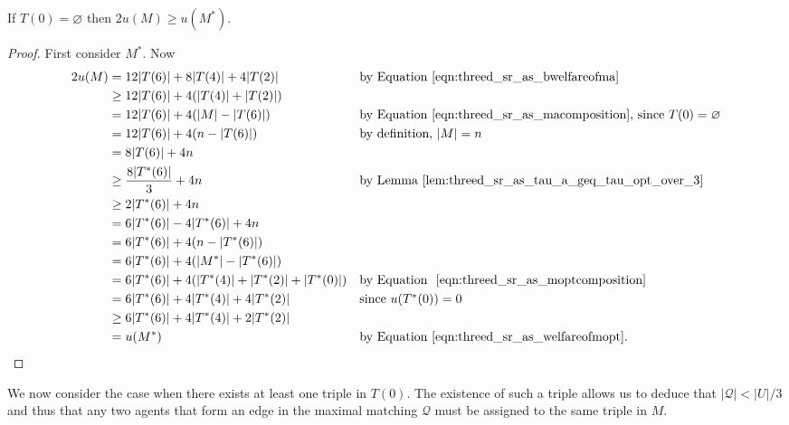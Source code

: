 \begin{lem}
\label{lem:threed_sr_as_no000exists_lem}
If $T(0) = \varnothing$ then $2{u(M)} \geq u(M^*)$.
\end{lem}
\begin{proof}
First consider $M^*$. 
Now
\begingroup
\allowdisplaybreaks
\begin{align*}
    2u(M) &= 12|T(6)| + 8|T(4)| + 4|T(2)| && \mbox{by Equation~\ref{eqn:threed_sr_as_bwelfareofma}}\\
    &\geq 12|T(6)| + 4(|T(4)| + |T(2)|)\\
    &= 12|T(6)| + 4(|M| - |T(6)|) && \mbox{by Equation~\ref{eqn:threed_sr_as_macomposition}, since $T(0)=\varnothing$}\\
    &= 12|T(6)| + 4(n - |T(6)|) && \mbox{by definition, $|M|=n$}\\
    &= 8|T(6)| + 4n\\[0.7em]
    &\geq \smash{\frac{8|T^*(6)|}{3}} + 4n && \mbox{by Lemma~\ref{lem:threed_sr_as_tau_a_geq_tau_opt_over_3}}\\[0.4em]
    &\geq 2|T^*(6)| + 4n\\
    &= 6|T^*(6)| - 4|T^*(6)| + 4n\\
    &= 6|T^*(6)| + 4(n - |T^*(6)|)\\
    &= 6|T^*(6)| + 4(|M^*| - |T^*(6)|)\\
    &= 6|T^*(6)| + 4(|T^*(4)| + |T^*(2)| + |T^*(0)|) && \mbox{by Equation~
    \ref{eqn:threed_sr_as_moptcomposition}}\\
    &= 6|T^*(6)| + 4|T^*(4)| + 4|T^*(2)| && \mbox{since $u(T^*(0))=0$}\\
    &\geq 6|T^*(6)| + 4|T^*(4)| + 2|T^*(2)|\\
    &= u(M^*) && \mbox{by Equation~\ref{eqn:threed_sr_as_welfareofmopt}.}
\end{align*}
\endgroup
\end{proof}
We now consider the case when there exists at least one triple in $T(0)$. The existence of such a triple allows us to deduce that $|\mathcal{Q}| < |U|/3$ and thus that any two agents that form an edge in the maximal matching $\mathcal{Q}$ must be assigned to the same triple in $M$.

